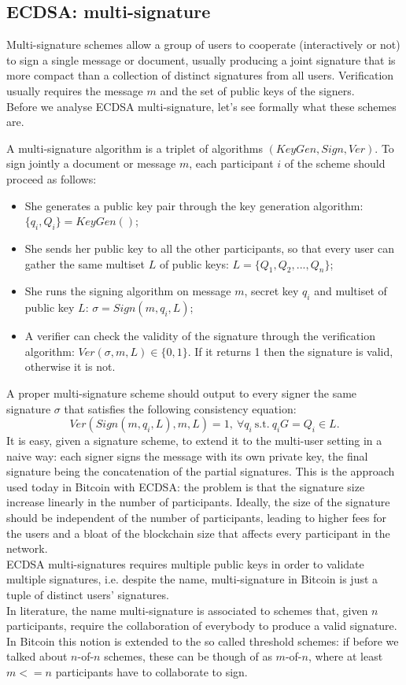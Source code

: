 \subsection{ECDSA: multi-signature}
Multi-signature schemes allow a group of users to cooperate (interactively or not) to sign a single message or document, usually producing a joint signature that is more compact than a collection of distinct signatures from all users. Verification usually requires the message $m$ and the set of public keys of the signers.
\\
Before we analyse ECDSA multi-signature, let's see formally what these schemes are.

\bigskip
\noindent
A multi-signature algorithm is a triplet of algorithms $(KeyGen, Sign, Ver)$. To sign jointly a document or message $m$, each participant $i$ of the scheme should proceed as follows:
\begin{itemize}
	\item She generates a public key pair through the key generation algorithm: $\{q_i, Q_i\} = KeyGen()$;
	\item She sends her public key to all the other participants, so that every user can gather the same multiset $L$ of public keys: $L = \{Q_1, Q_2, ..., Q_n\}$;
	\item She runs the signing algorithm on message $m$, secret key $q_i$ and multiset of public key $L$: $\sigma = Sign(m, q_i, L)$;
	\item A verifier can check the validity of the signature through the verification algorithm: $Ver(\sigma, m, L) \in \{0, 1\}$. If it returns 1 then the signature is valid, otherwise it is not.
\end{itemize}
A proper multi-signature scheme should output to every signer the same signature $\sigma$ that satisfies the following consistency equation: 
$$Ver(Sign(m, q_i, L), m, L) = 1, \ \forall q_i \ \text{s.t.} \ q_iG = Q_i \in L.$$
It is easy, given a signature scheme, to extend it to the multi-user setting in a naive way: each signer signs the message with its own private key, the final signature being the concatenation of the partial signatures. This is the approach used today in Bitcoin with ECDSA: the problem is that the signature size increase linearly in the number of participants. Ideally, the size of the signature should be independent of the number of participants, leading to higher fees for the users and a bloat of the blockchain size that affects every participant in the network.
\\
ECDSA multi-signatures requires multiple public keys in order to validate multiple signatures, i.e. despite the name, multi-signature in Bitcoin is just a tuple of distinct users' signatures.
\\
In literature, the name multi-signature is associated to schemes that, given $n$ participants, require the collaboration of everybody to produce a valid signature. In Bitcoin this notion is extended to the so called threshold schemes: if before we talked about $n$-of-$n$ schemes, these can be though of as $m$-of-$n$, where at least $m <= n$ participants have to collaborate to sign.

